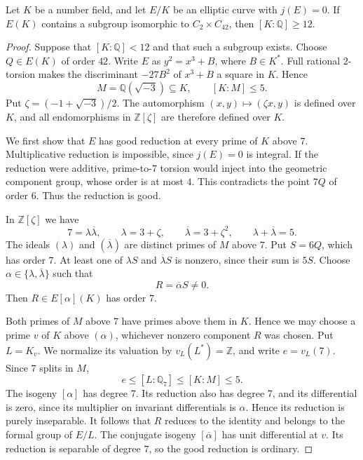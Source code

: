 \begin{lemma}\label{lem:decic242-no-j0}
Let $K$ be a number field, and let $E/K$ be an elliptic curve
with $j(E)=0$. If $E(K)$ contains a subgroup isomorphic to
$C_2\times C_{42}$, then $[K:\mathbb Q]\geq12$.
\end{lemma}
\begin{proof}
Suppose that $[K:\mathbb Q]<12$ and that such a subgroup exists.
Choose $Q\in E(K)$ of order $42$. Write $E$ as $y^2=x^3+B$, where $B\in K^*$.
Full rational $2$-torsion makes the discriminant $-27B^2$ of
$x^3+B$ a square in $K$. Hence
\[
 M=\mathbb Q(\sqrt{-3})\subseteq K,
 \qquad [K:M]\leq5.
\]
Put $\zeta=(-1+\sqrt{-3})/2$. The automorphism
$(x,y)\mapsto(\zeta x,y)$ is defined over $K$, and all
endomorphisms in $\mathbb Z[\zeta]$ are therefore defined over $K$.

We first show that $E$ has good reduction at every prime of $K$
above $7$. Multiplicative reduction is impossible, since $j(E)=0$
is integral. If the reduction were additive, prime-to-$7$ torsion
would inject into the geometric component group, whose order is
at most $4$. This contradicts the point $7Q$ of order $6$.
Thus the reduction is good.

In $\mathbb Z[\zeta]$ we have
\[
 7=\lambda\overline\lambda,
 \qquad \lambda=3+\zeta,
 \qquad \overline\lambda=3+\zeta^2,
 \qquad \lambda+\overline\lambda=5.
\]
The ideals $(\lambda)$ and $(\overline\lambda)$ are distinct
primes of $M$ above $7$. Put $S=6Q$, which has order $7$.
At least one of $\lambda S$ and $\overline\lambda S$ is nonzero,
since their sum is $5S$. Choose
$\alpha\in\{\lambda,\overline\lambda\}$ such that
\[
 R=\overline\alpha S\ne0.
\]
Then $R\in E[\alpha](K)$ has order $7$.

Both primes of $M$ above $7$ have primes above them in $K$.
Hence we may choose a prime $v$ of $K$ above $(\alpha)$,
whichever nonzero component $R$ was chosen. Put $L=K_v$.
We normalize its valuation by $v_L(L^*)=\mathbb Z$, and write
$e=v_L(7)$. Since $7$ splits in $M$,
\[
 e\leq[L:\mathbb Q_7]\leq[K:M]\leq5.
\]
The isogeny $[\alpha]$ has degree $7$. Its reduction also has
degree $7$, and its differential is zero, since its multiplier
on invariant differentials is $\alpha$. Hence its reduction is
purely inseparable. It follows that $R$ reduces to the identity
and belongs to the formal group of $E/L$.
The conjugate isogeny $[\overline\alpha]$ has unit differential
at $v$. Its reduction is separable of degree $7$, so the good
reduction is ordinary.


\end{proof}

